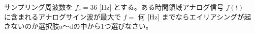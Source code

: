 サンプリング周波数を $f_s = 36$ [Hz] とする。ある時間領域アナログ信号 $f(t)$ に含まれるアナログサイン波が最大で $f=$ 何 [Hz] までならエイリアシングが起きないのか選択肢a〜dの中から1つ選びなさい。

